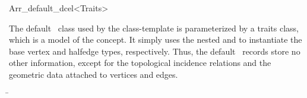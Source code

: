
\ccRefPageBegin

\begin{ccRefClass}{Arr_default_dcel<Traits>}

\ccDefinition

The default \dcel\ class used by the  class-template
is parameterized by a traits class, which is a model of the
 concept. It simply uses the nested
 and  to instantiate
the base vertex and halfedge types, respectively. Thus, the default
\dcel\ records store no other information, except for the topological
incidence relations and the geometric data attached to vertices and edges.


\ccIsModel

\ccInheritsFrom
  \begin{tabbing}
    \= \\
                        \>\\
                        \>
  \end{tabbing}

\ccSeeAlso


\end{ccRefClass}

\ccRefPageEnd
